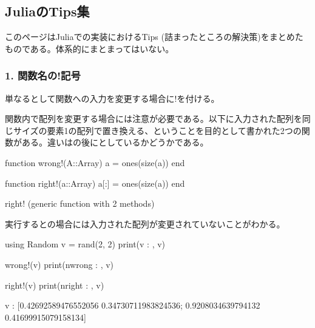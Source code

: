 \documentclass[letterpaper,10pt,english]{sphinxmanual}
\begin{document}
\subsection{JuliaのTips集}
\label{\detokenize{tips:juliatips}}\label{\detokenize{tips::doc}}
このページはJuliaでの実装におけるTips (詰まったところの解決策)をまとめたものである。体系的にまとまってはいない。


\subsubsection{1. 関数名の!記号}
\label{\detokenize{tips:id1}}
単なるとして関数への入力を変更する場合に!を付ける。

関数内で配列を変更する場合には注意が必要である。以下に入力された配列を同じサイズの要素1の配列で置き換える、ということを目的として書かれた2つの関数がある。違いはの後に\sphinxcode{\sphinxupquote{{[}:{]}}}としているかどうかである。

\begin{sphinxVerbatim}[commandchars=\\\{\}]
function wrong!(A::Array)
    a = ones(size(a))
end

function right!(a::Array)
    a[:] = ones(size(a))
end
\end{sphinxVerbatim}

\begin{sphinxVerbatim}[commandchars=\\\{\}]
right! (generic function with 2 methods)
\end{sphinxVerbatim}

実行するとの場合には入力された配列が変更されていないことがわかる。

\begin{sphinxVerbatim}[commandchars=\\\{\}]
using Random
v = rand(2, 2)
print(\PYGZdq{}v : \PYGZdq{}, v)

wrong!(v)
print(\PYGZdq{}\PYGZbs{}nwrong : \PYGZdq{}, v)

right!(v)
print(\PYGZdq{}\PYGZbs{}nright : \PYGZdq{}, v)
\end{sphinxVerbatim}

\begin{sphinxVerbatim}[commandchars=\\\{\}]
v : [0.42692589476552056 0.34730711983824536; 0.9208034639794132 0.41699915079158134]
\end{sphinxVerbatim}
\end{document}
